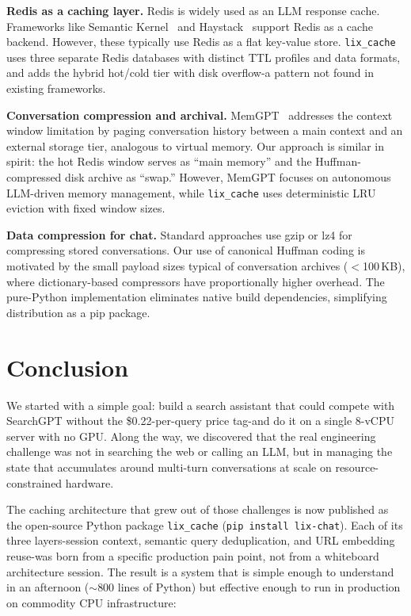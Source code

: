 \documentclass[conference]{IEEEtran}
\begin{document}
\textbf{Redis as a caching layer.}
Redis is widely used as an LLM response cache. Frameworks like Semantic Kernel~\cite{semantic_kernel2023} and Haystack~\cite{haystack2023} support Redis as a cache backend. However, these typically use Redis as a flat key-value store. \texttt{lix\_cache} uses three separate Redis databases with distinct TTL profiles and data formats, and adds the hybrid hot/cold tier with disk overflow-a pattern not found in existing frameworks.

\textbf{Conversation compression and archival.}
MemGPT~\cite{memgpt2023} addresses the context window limitation by paging conversation history between a main context and an external storage tier, analogous to virtual memory. Our approach is similar in spirit: the hot Redis window serves as ``main memory'' and the Huffman-compressed disk archive as ``swap.'' However, MemGPT focuses on autonomous LLM-driven memory management, while \texttt{lix\_cache} uses deterministic LRU eviction with fixed window sizes.

\textbf{Data compression for chat.}
Standard approaches use gzip or lz4 for compressing stored conversations. Our use of canonical Huffman coding is motivated by the small payload sizes typical of conversation archives ($<$100\,KB), where dictionary-based compressors have proportionally higher overhead. The pure-Python implementation eliminates native build dependencies, simplifying distribution as a pip package.

\section{Conclusion}
\label{sec:conclusion}

We started with a simple goal: build a search assistant that could compete with SearchGPT without the \$0.22-per-query price tag-and do it on a single 8-vCPU server with no GPU. Along the way, we discovered that the real engineering challenge was not in searching the web or calling an LLM, but in managing the state that accumulates around multi-turn conversations at scale on resource-constrained hardware.

The caching architecture that grew out of those challenges is now published as the open-source Python package \texttt{lix\_cache} (\texttt{pip install lix-chat}). Each of its three layers-session context, semantic query deduplication, and URL embedding reuse-was born from a specific production pain point, not from a whiteboard architecture session. The result is a system that is simple enough to understand in an afternoon (${\sim}800$ lines of Python) but effective enough to run in production on commodity CPU infrastructure:
\end{document}
